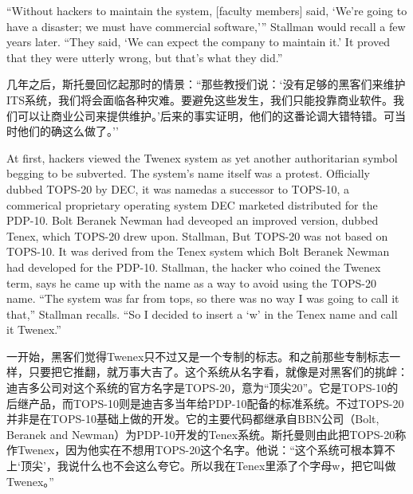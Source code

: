 \ifdefined\eng
``Without hackers to maintain the system, [faculty members] said, `We're going to have a disaster; we must have commercial software,'\hspace{0.01in}'' Stallman would recall a few years later. ``They said, `We can expect the company to maintain it.' It proved that they were utterly wrong, but that's what they did.''
\fi

\ifdefined\chs
几年之后，斯托曼回忆起那时的情景：``那些教授们说：`没有足够的黑客们来维护ITS系统，我们将会面临各种灾难。要避免这些发生，我们只能投靠商业软件。我们可以让商业公司来提供维护。'后来的事实证明，他们的这番论调大错特错。可当时他们的确这么做了。''
\fi

\ifdefined\eng
At first, hackers viewed the Twenex system as yet another authoritarian symbol begging to be subverted. The system's name itself was a protest. Officially dubbed TOPS-20 by DEC, it was \ifdefined\vtwo named\fi as a successor to TOPS-10, a \ifdefined\vone commerical \fi\ifdefined\vtwo proprietary \fi operating system DEC \ifdefined\vone marketed \fi\ifdefined\vtwo distributed \fi for the PDP-10. \ifdefined\vone Bolt Beranek Newman had deveoped an improved version, dubbed Tenex, which TOPS-20 drew upon. Stallman, \fi\ifdefined\vtwo But TOPS-20 was not based on TOPS-10.  It was derived from the Tenex system which Bolt Beranek Newman had developed for the PDP-10. Stallman, \fi the hacker who coined the Twenex term, says he came up with the name as a way to avoid using the TOPS-20 name. ``The system was far from tops, so there was no way I was going to call it that,'' Stallman recalls. ``So I decided to insert a `w' in the Tenex name and call it Twenex.''
\fi

\ifdefined\chs
一开始，黑客们觉得Twenex只不过又是一个专制的标志。和之前那些专制标志一样，只要把它推翻，就万事大吉了。这个系统从名字看，就像是对黑客们的挑衅：迪吉多公司对这个系统的官方名字是TOPS-20，意为``顶尖20''。它是TOPS-10的后继产品，而TOPS-10则是迪吉多当年给PDP-10配备的标准系统。不过TOPS-20并非是在TOPS-10基础上做的开发。它的主要代码都继承自BBN公司（Bolt, Beranek and Newman）为PDP-10开发的Tenex系统。斯托曼则由此把TOPS-20称作Twenex，因为他实在不想用TOPS-20这个名字。他说：``这个系统可根本算不上`顶尖'，我说什么也不会这么夸它。所以我在Tenex里添了个字母w，把它叫做Twenex。''
\fi

